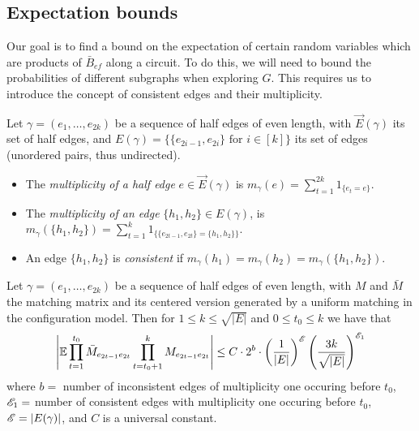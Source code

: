 \subsection{Expectation bounds}
\label{sec:expectation_bounds}

Our goal is to find a bound on the expectation of certain random variables
which are products of $\bar{B}_{ef}$ along a circuit.
To do this, we will need to bound the probabilities of different
subgraphs when exploring $G$.
This requires us to introduce the concept of consistent
edges and their multiplicity.

\begin{definition}\label{def:incon_edges}
Let $\gamma = (e_1, \ldots, e_{2k})$ be a sequence of half edges
of even length, with 
$\vec{E}(\gamma)$ its set of half edges,
and $E(\gamma) = \{ \{e_{2i-1}, e_{2i}\} \mbox{ for $i\in [k]$} \}$ its set of edges (unordered pairs, thus undirected).
\begin{itemize}
    \item The {\em multiplicity of a half edge} $e \in \vec{E}(\gamma)$
    is $m_\gamma(e) = \sum_{t=1}^{2k} 1_{\{ e_t = e \}}$.
    \item The {\em multiplicity of an edge} $\{h_1, h_2\} \in E(\gamma)$,
    is 
    $m_\gamma(\{h_1,h_2\}) = 
    \sum_{t=1}^k 1_{\{ \{e_{2t-1}, e_{2t}\} = \{h_1, h_2\} \}}$.
    \item An edge $\{h_1, h_2\}$ is {\em consistent} if 
    $m_\gamma(h_1) = m_\gamma(h_2) = m_\gamma(\{h_1, h_2\})$.
\end{itemize}
\end{definition}

\begin{lemma}
\label{expectation_bound}
Let  
$\gamma = (e_1, \ldots, e_{2k})$ be a sequence of half edges
of even length, with
$M$ and $\bar{M}$ the matching matrix and its
centered version generated by a uniform matching in the 
configuration model. 
Then for $1 \leq k \leq \sqrt{|E|}$ and $0 \leq t_0 \leq k$
we have that
\[
\left| 
\mathbb{E} 
\prod_{t=1}^{t_0} \bar{M}_{e_{2t - 1} e_{2t}}
\prod_{t=t_0+1}^{k} M_{e_{2t - 1} e_{2t}}
\right|
\leq 
C \cdot 2^b \cdot 
\left( \frac{1}{|E|} \right)^{\mathscr{E}}
\left( \frac{3 k}{\sqrt{|E|}} \right)^{\mathscr{E}_1}
\]
where
$b = $ number of inconsistent edges of multiplicity one occuring
before $t_0$,
$\mathscr{E}_1 = $ number of consistent edges with multiplicity one
occuring before $t_0$,
$\mathscr{E} = |E(\gamma)|$,
and $C$ is a universal constant.
\end{lemma}

